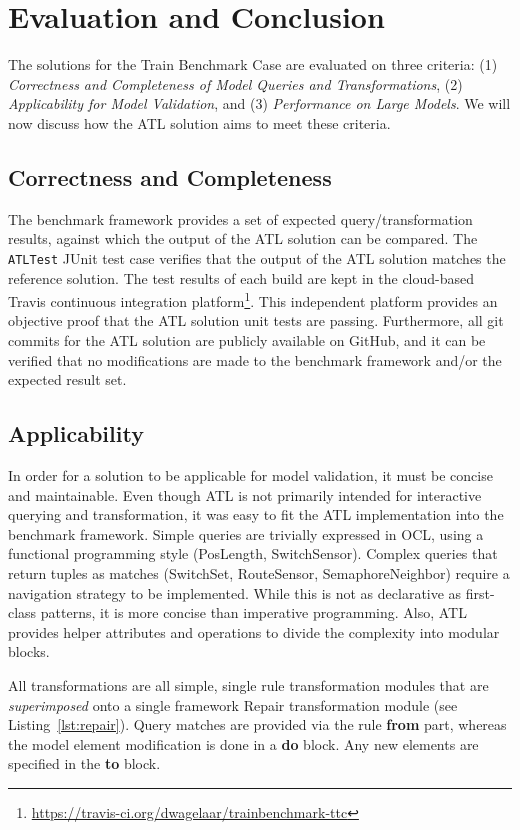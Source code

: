 \documentclass[submission,copyright,creativecommons]{eptcs}
\begin{document}
\section{Evaluation and Conclusion}
\label{sec:eval}

The solutions for the Train Benchmark Case are evaluated on three criteria: (1) \emph{Correctness and Completeness of Model Queries and Transformations}, (2) \emph{Applicability for Model Validation}, and (3) \emph{Performance on Large Models}. We will now discuss how the ATL solution aims to meet these criteria.

\subsection{Correctness and Completeness}

The benchmark framework provides a set of expected query/transformation results, against which the output of the ATL solution can be compared. The \texttt{ATLTest} JUnit test case verifies that the output of the ATL solution matches the reference solution. The test results of each build are kept in the cloud-based Travis continuous integration platform\footnote{\url{https://travis-ci.org/dwagelaar/trainbenchmark-ttc}}. This independent platform provides an objective proof that the ATL solution unit tests are passing. Furthermore, all git commits for the ATL solution are publicly available on GitHub, and it can be verified that no modifications are made to the benchmark framework and/or the expected result set.

\subsection{Applicability}

In order for a solution to be applicable for model validation, it must be concise and maintainable. Even though ATL is not primarily intended for interactive querying and transformation, it was easy to fit the ATL implementation into the benchmark framework. Simple queries are trivially expressed in OCL, using a functional programming style (PosLength, SwitchSensor). Complex queries that return tuples as matches (SwitchSet, RouteSensor, SemaphoreNeighbor) require a navigation strategy to be implemented. While this is not as declarative as first-class patterns, it is more concise than imperative programming. Also, ATL provides helper attributes and operations to divide the complexity into modular blocks.

All transformations are all simple, single rule transformation modules that are \emph{superimposed} onto a single framework Repair transformation module (see Listing~\ref{lst:repair}). Query matches are provided via the rule \textbf{from} part, whereas the model element modification is done in a \textbf{do} block. Any new elements are specified in the \textbf{to} block.
\end{document}
